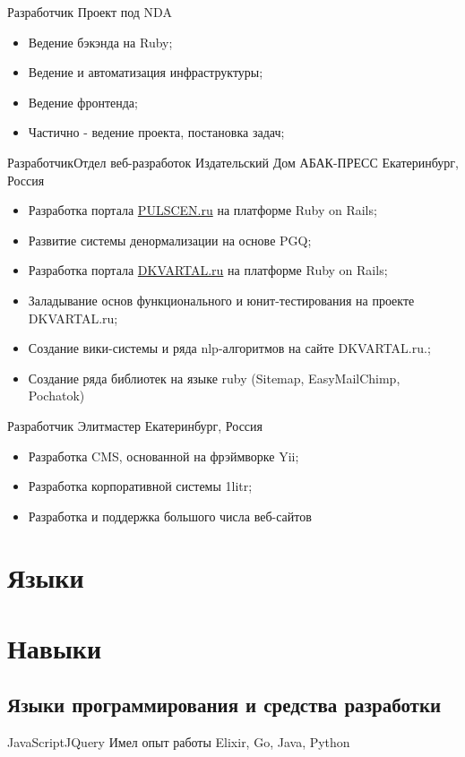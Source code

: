 \documentclass[11pt,a4paper]{moderncv}
\begin{document}
  {Разработчик}{}
  {Проект под NDA}
  {}
{
\begin{itemize}
  \item Ведение бэкэнда на Ruby;
  \item Ведение и автоматизация инфраструктуры;
  \item Ведение фронтенда;
  \item Частично - ведение проекта, постановка задач;
\end{itemize}
}

  {Разработчик}{Отдел веб-разработок}
  {Издательский Дом АБАК-ПРЕСС}
  {Екатеринбург, Россия}
{
\begin{itemize}
  \item Разработка портала \href{http://pulscen.ru}{PULSCEN.ru} на платформе Ruby on Rails;
  \item Развитие системы денормализации на основе PGQ;
  \item Разработка портала \href{http://dkvartal.ru}{DKVARTAL.ru} на платформе Ruby on Rails;
  \item Заладывание основ функционального и юнит-тестирования на проекте {DKVARTAL.ru};
  \item Создание вики-системы и ряда nlp-алгоритмов на сайте {DKVARTAL.ru}.;
  \item Создание ряда библиотек на языке ruby (Sitemap, EasyMailChimp, Pochatok)
\end{itemize}
}

\cvitem {}{}

  {Разработчик}{}
  {Элитмастер}
  {Екатеринбург, Россия}
{
\begin{itemize}
  \item Разработка CMS, основанной на фрэймворке Yii;
  \item Разработка корпоративной системы {1litr};
  \item Разработка и поддержка большого числа веб-сайтов
\end{itemize}
}


\section{Языки}

\section{Навыки}
\subsection{Языки программирования и средства разработки}
{JavaScript}{JQuery}
\cvcomputer
{Имел опыт работы} {Elixir, Go, Java, Python}
{}{}
\end{document}
